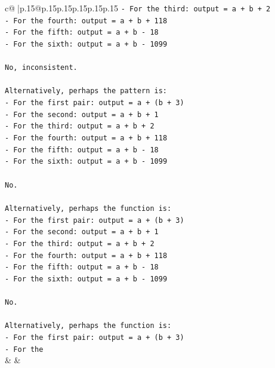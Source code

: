 \documentclass{article}
\begin{document}
{\begin{supertabular}{c@{$\;$}|p{.15\linewidth}@{}p{.15\linewidth}p{.15\linewidth}p{.15\linewidth}p{.15\linewidth}p{.15\linewidth}}
{{{\texttt{{-} For the third: output = a + b + 2} \\
\texttt{{-} For the fourth: output = a + b + 118} \\
\texttt{{-} For the fifth: output = a + b {-} 18} \\
\texttt{{-} For the sixth: output = a + b {-} 1099} \\
\\ 
\texttt{No, inconsistent.} \\
\\ 
\texttt{Alternatively, perhaps the pattern is:} \\
\texttt{{-} For the first pair: output = a + (b + 3)} \\
\texttt{{-} For the second: output = a + b + 1} \\
\texttt{{-} For the third: output = a + b + 2} \\
\texttt{{-} For the fourth: output = a + b + 118} \\
\texttt{{-} For the fifth: output = a + b {-} 18} \\
\texttt{{-} For the sixth: output = a + b {-} 1099} \\
\\ 
\texttt{No.} \\
\\ 
\texttt{Alternatively, perhaps the function is:} \\
\texttt{{-} For the first pair: output = a + (b + 3)} \\
\texttt{{-} For the second: output = a + b + 1} \\
\texttt{{-} For the third: output = a + b + 2} \\
\texttt{{-} For the fourth: output = a + b + 118} \\
\texttt{{-} For the fifth: output = a + b {-} 18} \\
\texttt{{-} For the sixth: output = a + b {-} 1099} \\
\\ 
\texttt{No.} \\
\\ 
\texttt{Alternatively, perhaps the function is:} \\
\texttt{{-} For the first pair: output = a + (b + 3)} \\
\texttt{{-} For the} \\
            }
        }
    }
    & & \\ \\


\end{supertabular}}
\end{document}
